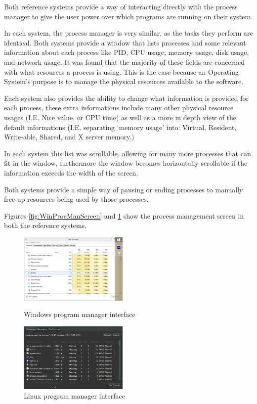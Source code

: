 \documentclass[a4paper]{report}
\begin{document}
Both reference systems provide a way of interacting directly with the process manager to give the user power over which programs are running on their system.

In each system, the process manager is very similar, as the tasks they perform are identical. Both systems provide a window that lists processes and some relevant information about each process like PID, CPU usage, memory usage, disk usage, and network usage. It was found that the majority of these fields are concerned with what resources a process is using. This is the case because an Operating System's purpose is to manage the physical resources available to the software.

Each system also provides the ability to change what information is provided for each process, these extra informations include many other physical resource usages (I.E. Nice value, or CPU time) as well as a more in depth view of the default informations (I.E. separating `memory usage' into: Virtual, Resident, Write-able, Shared, and X server memory.)

In each system this list was scrollable, allowing for many more processes that can fit in the window, furthermore the window becomes horizontally scrollable if the information exceeds the width of the screen.

Both systems provide a simple way of pausing or ending processes to manually free up resources being used by those processes.

Figures \ref{fig:WinProcManScreen} and \ref{fig:LinProcManScreen} show the process management screen in both the reference systems.

\begin{figure}[ht]
\centering
\begin{minipage}{.5\textwidth}
  \centering
  \includegraphics[width=200px]{images/Windows_Program_Manager_Screenshot}
  \caption{Windows program manager interface}
  \label{fig:WinProcManScreen}
\end{minipage}%
\begin{minipage}{.5\textwidth}
  \centering
  \includegraphics[width=200px]{images/Linux_Program_Manager_Screenshot}
  \caption{Linux program manager interface}
  \label{fig:LinProcManScreen}
\end{minipage}
\end{figure}
\end{document}
